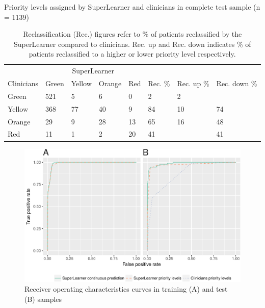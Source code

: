 \documentclass[10pt,letterpaper]{article}\usepackage[]{graphicx}\usepackage[]{color}
\begin{document}
\begin{table}[ht]
\centering
\caption{Priority levels assigned by SuperLearner and clinicians in complete test sample (n = 1139)} 
\label{tab:reclass_all}
\begin{tabular}{llllllll}
  \hline
  & \multicolumn{4}{c}{SuperLearner} \\
 Clinicians & Green & Yellow & Orange & Red & Rec. \% & Rec. up \% & Rec. down \% \\
 \hline
Green & 521 & 5 & 6 & 0 & 2 & 2 &  \\ 
  Yellow & 368 & 77 & 40 & 9 & 84 & 10 & 74 \\ 
  Orange & 29 & 9 & 28 & 13 & 65 & 16 & 48 \\ 
  Red & 11 & 1 & 2 & 20 & 41 &  & 41 \\ 
   \hline
\end{tabular}
\caption*{Reclassification (Rec.) figures refer to \% of patients reclassified by the SuperLearner compared to clinicians. Rec. up and Rec. down indicates \% of patients reclassified to a higher or lower priority level respectively.} 
\end{table}


\begin{figure}
  \caption{Receiver operating characteristics curves in training (A) and test
    (B) samples}
  \label{fig:roc_plot}
  \includegraphics[width=\textwidth]{roc_plot.pdf}
\end{figure}
\end{document}
